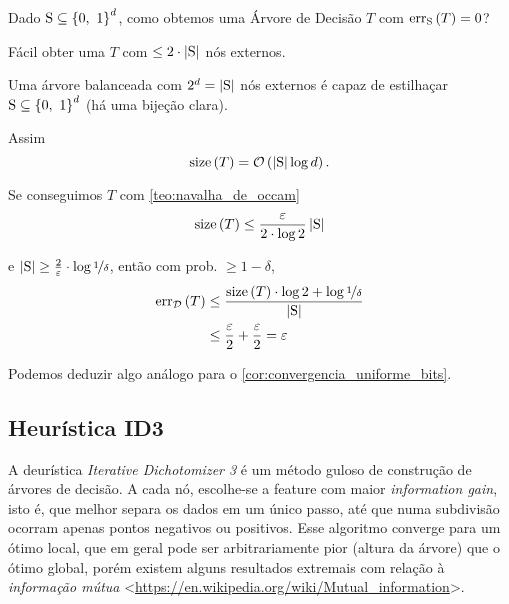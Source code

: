 \begin{exercicio}
  Dado $\mathrm{S}\subseteq\left\{0,\ 1\vphantom{1j}\right\}^d$, como obtemos uma Árvore de Decisão $T$ com $\mathrm{err}_\mathrm{S}\left(T\vphantom{1j}\right)=0$?
  
  Fácil obter uma $T$ com $\leq2\cdot\left|\mathrm{S}\vphantom{1j}\right|$ nós externos.
\end{exercicio}
\begin{resolucao}
  Uma árvore balanceada com $2^d=\left|\mathrm{S}\vphantom{1j}\right|$ nós externos é capaz de estilhaçar $\mathrm{S}\subseteq\left\{0,\ 1\vphantom{1j}\right\}^d$ (há uma bijeção clara).

  Assim
  \[
    \mathrm{size}\left(T\vphantom{1j}\right) = \mathcal{O}\left(\left|\mathrm{S}\vphantom{1j}\right|\log d\vphantom{1j}\right).
  \]

  Se conseguimos $T$ com \autoref{teo:navalha_de_occam}
  \[
    \mathrm{size}\left(T\vphantom{1j}\right) \leq \frac{\varepsilon}{2\cdot\log 2} \left|\mathrm{S}\vphantom{1j}\right|
  \]

  e $\left|\mathrm{S}\vphantom{1j}\right|\geq\frac{2}{\varepsilon}\cdot\log\nicefrac{1}{\delta}$, então com prob. $\geq 1-\delta$,
  \begin{align}
    \mathrm{err}_\mathcal{D}\left(T\vphantom{1j}\right) &\leq \frac{\mathrm{size}\left(T\vphantom{1j}\right)\cdot\log2 + \log\nicefrac{1}{\delta}}{\left|\mathrm{S}\vphantom{1j}\right|}  \\
                                    &\leq \frac{\varepsilon}{2} + \frac{\varepsilon}{2} = \varepsilon
  \end{align}

  Podemos deduzir algo análogo para o \autoref{cor:convergencia_uniforme_bits}.
\end{resolucao}

\subsection{Heurística ID3}

A deurística \textit{Iterative Dichotomizer 3} é um método guloso de construção de árvores de decisão. A cada nó, escolhe-se a feature com maior \textit{information gain}, isto é, que melhor separa os dados em um único passo, até que numa subdivisão ocorram apenas pontos negativos ou positivos. Esse algoritmo converge para um ótimo local, que em geral pode ser arbitrariamente pior (altura da árvore) que o ótimo global, porém existem alguns resultados extremais com relação à \textit{informação mútua} <\href{https://en.wikipedia.org/wiki/Mutual\_information}{https://en.wikipedia.org/wiki/Mutual\_information}>.

